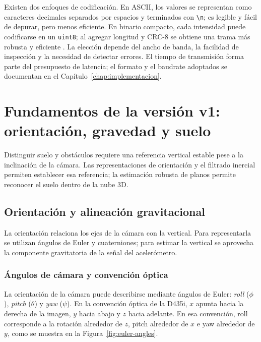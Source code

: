 Existen dos enfoques de codificación. En ASCII, los valores se representan como caracteres
decimales separados por espacios y terminados con \texttt{\textbackslash n}; es legible y
fácil de depurar, pero menos eficiente. En binario compacto, cada intensidad puede codificarse
en un \texttt{uint8}; al agregar longitud y CRC-8 se obtiene una trama más robusta y eficiente
\cite{smbus2000}. La elección depende del ancho de banda, la facilidad de inspección y la
necesidad de detectar errores. El tiempo de transmisión forma parte del presupuesto de latencia;
el formato y el baudrate adoptados se documentan en el Capítulo~\ref{chap:implementacion}.

\section{Fundamentos de la versión v1: orientación, gravedad y suelo}
\label{sec:mt-v1}

Distinguir suelo y obstáculos requiere una referencia vertical estable pese a la inclinación de
la cámara. Las representaciones de orientación y el filtrado inercial permiten establecer esa
referencia; la estimación robusta de planos permite reconocer el suelo dentro de la nube 3D.

\subsection{Orientación y alineación gravitacional}
\label{sec:mt-orientacion-gravitacional}

La orientación relaciona los ejes de la cámara con la vertical. Para representarla se utilizan
ángulos de Euler y cuaterniones; para estimar la vertical se aprovecha la componente gravitatoria
de la señal del acelerómetro.

\subsubsection{Ángulos de cámara y convención óptica}

La orientación de la cámara puede describirse mediante ángulos de Euler: \emph{roll} ($\phi$),
\emph{pitch} ($\theta$) y \emph{yaw} ($\psi$). En la convención óptica de la D435i, $x$
apunta hacia la derecha de la imagen, $y$ hacia abajo y $z$ hacia adelante. En esa convención, roll
corresponde a la rotación alrededor de $z$, pitch alrededor de $x$ e yaw alrededor de $y$,
como se muestra en la Figura~\ref{fig:euler-angles}.

